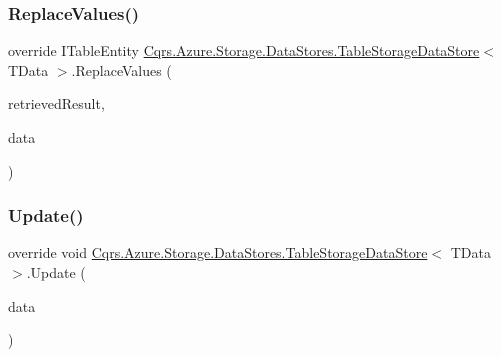 \subsubsection{\texorpdfstring{Replace\+Values()}{ReplaceValues()}}
{\footnotesize\ttfamily override I\+Table\+Entity \hyperlink{classCqrs_1_1Azure_1_1Storage_1_1DataStores_1_1TableStorageDataStore}{Cqrs.\+Azure.\+Storage.\+Data\+Stores.\+Table\+Storage\+Data\+Store}$<$ T\+Data $>$.Replace\+Values (\begin{DoxyParamCaption}\item[{Table\+Result}]{retrieved\+Result,  }\item[{\hyperlink{classCqrs_1_1Azure_1_1BlobStorage_1_1EntityTableEntity}{Entity\+Table\+Entity}$<$ T\+Data $>$}]{data }\end{DoxyParamCaption})\hspace{0.3cm}{\ttfamily [protected]}}

\mbox{\label{classCqrs_1_1Azure_1_1Storage_1_1DataStores_1_1TableStorageDataStore_a9afab2cca66ca4453b2ab56916578c7d}} 
\subsubsection{\texorpdfstring{Update()}{Update()}}
{\footnotesize\ttfamily override void \hyperlink{classCqrs_1_1Azure_1_1Storage_1_1DataStores_1_1TableStorageDataStore}{Cqrs.\+Azure.\+Storage.\+Data\+Stores.\+Table\+Storage\+Data\+Store}$<$ T\+Data $>$.Update (\begin{DoxyParamCaption}\item[{T\+Data}]{data }\end{DoxyParamCaption})}

